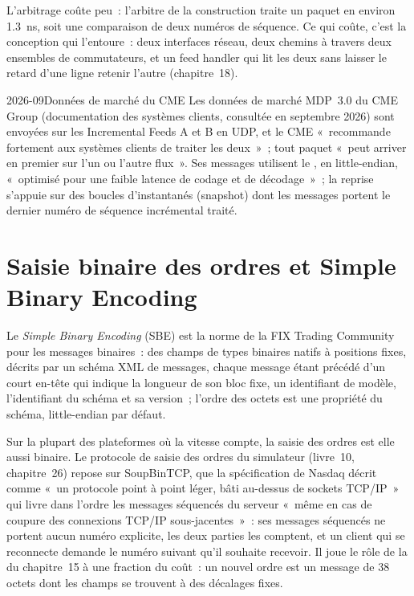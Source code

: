 L'arbitrage coûte peu~: l'arbitre de la construction traite un paquet en environ \qty{1.3}{\nano\second}, soit une comparaison de deux
numéros de séquence. Ce qui coûte, c'est la conception qui l'entoure~: deux interfaces réseau, deux chemins à travers deux ensembles de commutateurs, et un
feed handler qui lit les deux sans laisser le retard d'une ligne retenir l'autre (chapitre~18).

\begin{dated}{2026-09}{Données de marché du CME}\label{dat:ll:protocols-ii-binary-exchange-protocols:cme}
Les données de marché MDP~3.0 du CME Group (documentation des systèmes clients, consultée en septembre 2026) sont envoyées sur les Incremental Feeds A et B
en UDP, et le CME «~recommande fortement aux systèmes clients de traiter les deux~»~; tout paquet «~peut arriver en premier sur l'un ou l'autre flux~».
Ses messages utilisent le , en little-endian, «~optimisé pour une faible latence de codage et de décodage~»~; la reprise s'appuie sur
des boucles d'instantanés (snapshot) dont les messages portent le dernier numéro de séquence incrémental traité.
\end{dated}

\section{Saisie binaire des ordres et Simple Binary Encoding}

\begin{definition}\label{def:ll:protocols-ii-binary-exchange-protocols:sbe}
Le \emph{Simple Binary Encoding} (SBE) est la norme de la FIX Trading Community pour les messages binaires~:
des champs de types binaires natifs à positions fixes, décrits par un schéma XML de messages, chaque message étant précédé d'un court en-tête
qui indique la longueur de son bloc fixe, un identifiant de modèle, l'identifiant du schéma et sa version~; l'ordre des octets est une
propriété du schéma, little-endian par défaut.
\end{definition}

Sur la plupart des plateformes où la vitesse compte, la saisie des ordres est elle aussi binaire. Le protocole de saisie des ordres du simulateur (livre~10,
chapitre~26) repose sur SoupBinTCP, que la spécification de Nasdaq décrit comme «~un protocole point à point léger, bâti au-dessus de
sockets TCP/IP~» qui livre dans l'ordre les messages séquencés du serveur «~même en cas de coupure des
connexions TCP/IP sous-jacentes~»~: ses messages séquencés ne portent aucun numéro explicite, les deux parties les comptent, et un client qui se reconnecte
demande le numéro suivant qu'il souhaite recevoir. Il joue le rôle de la  du chapitre~15 à une fraction du coût~: un nouvel ordre est un
message de 38 octets dont les champs se trouvent à des décalages fixes.

